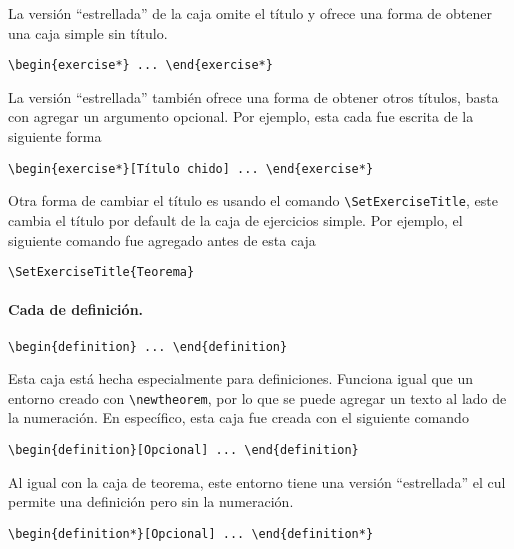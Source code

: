 \documentclass[11pt]{article}
\begin{document}
\begin{exercise*}
  La versión ``estrellada'' de la caja omite el título y ofrece una forma de obtener una caja simple sin título.

  \verb|\begin{exercise*} ... \end{exercise*}|
\end{exercise*}

\begin{exercise*}
  La versión ``estrellada'' también ofrece una forma de obtener otros títulos, basta con agregar un argumento opcional. Por ejemplo, esta cada fue escrita de la siguiente forma

  \verb|\begin{exercise*}[Título chido] ... \end{exercise*}|
\end{exercise*}


\begin{exercise}
  Otra forma de cambiar el título es usando el comando \verb|\SetExerciseTitle|, este cambia el título por default de la caja de ejercicios simple. Por ejemplo, el siguiente comando fue agregado antes de esta caja

  \verb|\SetExerciseTitle{Teorema}|
\end{exercise}


\paragraph{Cada de definición.} \verb|\begin{definition} ... \end{definition}|

\begin{definition}[Opcional]
  Esta caja está hecha especialmente para definiciones. Funciona igual que un entorno creado con \verb|\newtheorem|, por lo que se puede agregar un texto al lado de la numeración. En específico, esta caja fue creada con el siguiente comando

  \verb|\begin{definition}[Opcional] ... \end{definition}|
\end{definition}

\begin{definition*}[Opcional]
  Al igual con la caja de teorema, este entorno tiene una versión ``estrellada'' el cul permite una definición pero sin la numeración.

  \verb|\begin{definition*}[Opcional] ... \end{definition*}|
\end{definition*}
\end{document}
